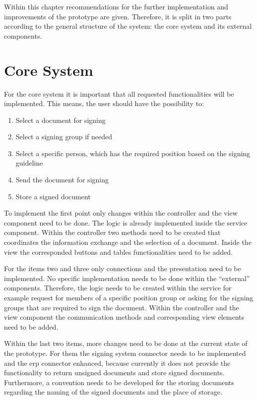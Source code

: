 Within this chapter recommendations for the further implementation and improvements of the prototype are given. \newline
Therefore, it is split in two parts according to the general structure of the system: the core system and its external components.


\section{Core System}

For the core system it is important that all requested functionalities will be implemented. This means, the user should have the possibility to:

\begin{enumerate}

\item Select a document for signing
\item Select a signing group if needed
\item Select a specific person, which has the required position based on the signing guideline
\item Send the document for signing
\item Store a signed document

\end{enumerate}

To implement the first point only changes within the controller and the view component need to be done. The logic is already implemented inside the service component. Within the controller two methods need to be created that coordinates the information exchange and the selection of a document. Inside the view the corresponded buttons and tables functionalities need to be added.


For the items two and three only connections and the presentation need to be implemented. No specific implementation needs to be done within the ``external'' components. Therefore, the logic needs to be created within the service for example request for members of a specific position group or asking for the signing groups that are required to sign the document. Within the controller and the view component the communication methods and corresponding view elements need to be added. 

Within the last two items, more changes need to be done at the current state of the prototype. For them the signing system connector needs to be implemented and the \gls{erp} connector enhanced, because currently it does not provide the functionality to return unsigned documents and store signed documents. Furthermore, a convention needs to be developed for the storing documents regarding the naming of the signed documents and the place of storage.

